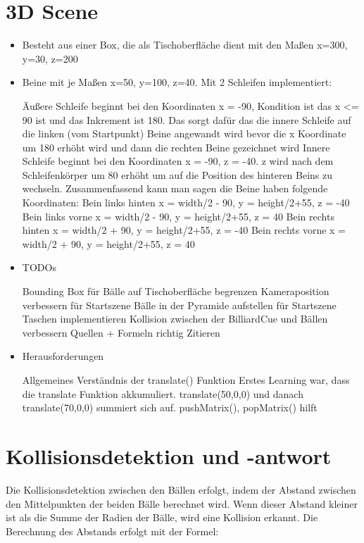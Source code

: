 \documentclass[11pt,a4paper]{article}
\begin{document}
\section{3D Scene }
\begin{itemize}
	\item Besteht aus einer Box, die als Tischoberfläche dient mit den Maßen x=300, y=30, z=200
	\item Beine mit je Maßen x=50, y=100, z=40. Mit 2 Schleifen implementiert:
	\begin{outline}
	\1 Äußere Schleife beginnt bei den Koordinaten x = -90, Kondition ist das x <= 90 ist und das Inkrement ist 180. Das sorgt dafür das die innere Schleife auf die linken (vom Startpunkt) Beine angewandt wird bevor die x Koordinate um 180 erhöht wird und dann die rechten Beine gezeichnet wird
	\1 Innere Schleife beginnt bei den Koordinaten x = -90, z = -40. z wird nach dem Schleifenkörper um 80 erhöht um auf die Position des hinteren Beins zu wechseln.
	\1 Zusammenfassend kann man sagen die Beine haben folgende Koordinaten:
	\2 Bein links hinten x = width/2 - 90, y = height/2+55, z = -40
	\2 Bein links vorne x = width/2 - 90, y = height/2+55, z = 40
	\2 Bein rechts hinten x = width/2 + 90, y = height/2+55, z = -40
	\2 Bein rechts vorne x = width/2 + 90, y = height/2+55, z = 40
	\end{outline}
	\item TODOs
	\begin{outline}
		\1 Bounding Box für Bälle auf Tischoberfläche begrenzen
		\1 Kameraposition verbessern für Startszene
		\1 Bälle in der Pyramide aufstellen für Startszene
		\1 Taschen implementieren
		\1 Kollision zwischen der BilliardCue und Bällen verbessern
		\1 Quellen + Formeln richtig Zitieren
	\end{outline}
	\item Herausforderungen
	\begin{outline}
		\1 Allgemeines Verständnis der translate() Funktion
		\2 Erstes Learning war, dass die translate Funktion akkumuliert. translate(50,0,0) und danach translate(70,0,0) summiert sich auf. pushMatrix(), popMatrix() hilft
	\end{outline}
	\end{itemize}
	\newpage
	\section{Kollisionsdetektion und -antwort}

Die Kollisionsdetektion zwischen den Bällen erfolgt, indem der Abstand zwischen den Mittelpunkten der beiden Bälle berechnet wird. Wenn dieser Abstand kleiner ist als die Summe der Radien der Bälle, wird eine Kollision erkannt. Die Berechnung des Abstands erfolgt mit der Formel:
\end{document}
